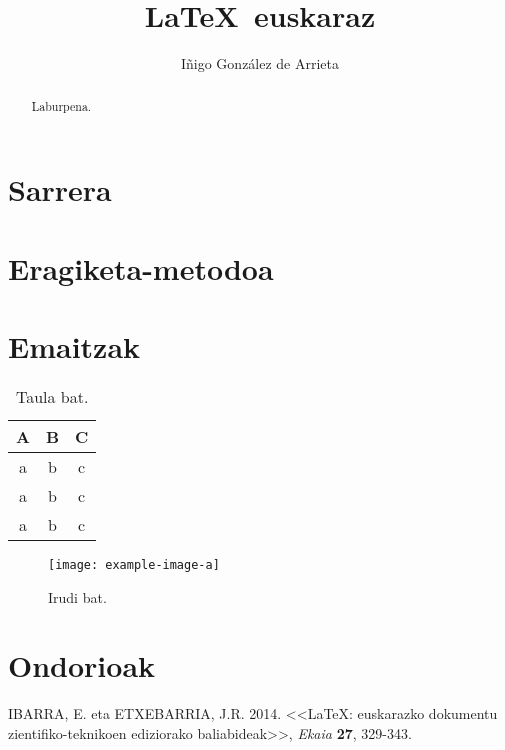 \documentclass[a4paper]{article}
\title{\LaTeX \, euskaraz}
\author{Iñigo González de Arrieta}
\date{\eusdata} %
\begin{document}
\maketitle

\begin{abstract}
    Laburpena.
\end{abstract}

\section{Sarrera}

\lipsum[1]

\section{Eragiketa-metodoa}

\lipsum[2]

\section{Emaitzak}

\lipsum[3]

\begin{table}[ht]
\centering
\caption{Taula bat.}
\begin{tabular}{ccc}
A & B & C \\
\hline
a & b & c \\
a & b & c \\
a & b & c  
\end{tabular}
\end{table}

\begin{figure}[ht]
    \centering
    \texttt{[image: example-image-a]}
    \caption{Irudi bat.}
\end{figure}

\section{Ondorioak}

\lipsum[4]

\begin{thebibliography}{99}
 IBARRA, E. eta ETXEBARRIA, J.R. 2014. <<\LaTeX: euskarazko dokumentu zientifiko-teknikoen ediziorako baliabideak>>, \textit{Ekaia} \textbf{27}, 329-343.
\end{thebibliography}
\end{document}
